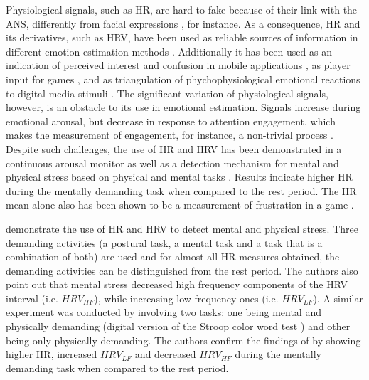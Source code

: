 Physiological signals, such as HR, are hard to fake because of their link with the ANS, differently from facial expressions \parencite{Landowska}, for instance. As a consequence, HR and its derivatives, such as HRV, have been used as reliable sources of information in different emotion estimation methods \parencite{kukolja2014comparative}. Additionally it has been used as an indication of perceived interest and confusion in mobile applications \parencite{xiao2015towards}, as player input for games \parencite{stockhausen2013beats}, and as triangulation of phychophysiological emotional reactions to digital media stimuli \parencite{nogueira2015annotation}. The significant variation of physiological signals, however, is an obstacle to its use in emotional estimation. Signals increase during emotional arousal, but decrease in response to attention engagement, which makes the measurement of engagement, for instance, a non-trivial process \parencite{ravaja20051}. Despite such challenges, the use of HR and HRV has been demonstrated in a continuous arousal monitor \parencite{grundlehner2009design} as well as a detection mechanism for mental and physical stress based on physical and mental tasks \parencite{vandeput2009heart,garde2002effects}. Results indicate higher HR during the mentally demanding task when compared to the rest period. The HR mean alone also has been shown to be a measurement of frustration in a game \parencite{rodriguez2015vr}.


\textcite{vandeput2009heart} demonstrate the use of HR and HRV to detect mental and physical stress. Three demanding activities (a postural task, a mental task and a task that is a combination of both) are used and for almost all HR measures obtained, the demanding activities can be distinguished from the rest period. The authors also point out that mental stress decreased high frequency components of the HRV interval (i.e. $HRV_{HF}$), while increasing low frequency ones (i.e. $HRV_{LF}$). A similar experiment was conducted by \textcite{garde2002effects} involving two tasks: one being mental and physically demanding (digital version of the Stroop color word test \parencite{golden1978stroop}) and other being only physically demanding. The authors confirm the findings of \textcite{vandeput2009heart} by showing higher HR, increased $HRV_{LF}$ and decreased $HRV_{HF}$ during the mentally demanding task when compared to the rest period.

